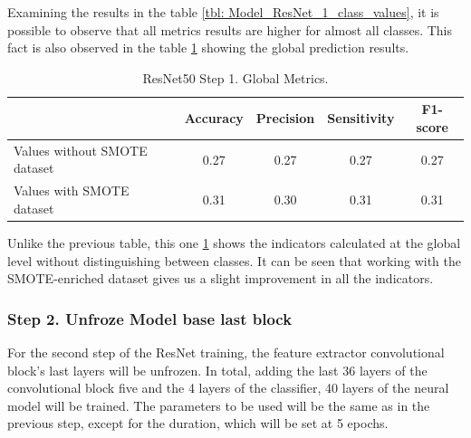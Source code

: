 Examining the results in the table \ref{tbl: Model_ResNet_1_class_values}, it is possible to observe that all metrics results are higher for almost all classes. This fact is also observed in the table \ref{tbl: Model_RNet50_1_global_values} showing the global prediction results.

\begin{table}[ht]
\centering
\begin{tabular}{lcccc}
\cline{2-5}
 & \textbf{Accuracy} & \textbf{Precision} & \textbf{Sensitivity} & \textbf{F1-score} \\ \hline
Values without SMOTE dataset & 0.27 & 0.27 & 0.27 & 0.27 \\ \hline
Values with SMOTE dataset & 0.31 & 0.30 & 0.31 & 0.31 \\ \hline
\end{tabular}
    \caption{ResNet50 Step 1. Global Metrics.}
    \label{tbl: Model_RNet50_1_global_values}
\end{table}

Unlike the previous table, this one \ref{tbl: Model_RNet50_1_global_values} shows the indicators calculated at the global level without distinguishing between classes. It can be seen that working with the SMOTE-enriched dataset gives us a slight improvement in all the indicators. 

\clearpage

\subsubsection{Step 2. Unfroze Model base last block}

For the second step of the ResNet training, the feature extractor convolutional block's last layers will be unfrozen. In total, adding the last 36 layers of the convolutional block five and the 4 layers of the classifier, 40 layers of the neural model will be trained. The parameters to be used will be the same as in the previous step, except for the duration, which will be set at 5 epochs.

